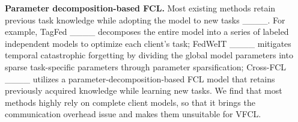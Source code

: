 \noindent\textbf{Parameter decomposition-based FCL.}
Most existing methods retain previous task knowledge while adopting the model to new tasks ____. 
For example, TagFed ____ decomposes the entire model into a series of labeled independent models to optimize each client’s task; FedWeIT ____ mitigates temporal catastrophic forgetting by dividing the global model parameters into sparse task-specific parameters through parameter sparsification; Cross-FCL ____ utilizes a parameter-decomposition-based FCL model that retains previously acquired knowledge while learning new tasks. 
We find that most methods highly rely on complete client models, so that it brings the communication overhead issue and makes them unsuitable for VFCL. 



